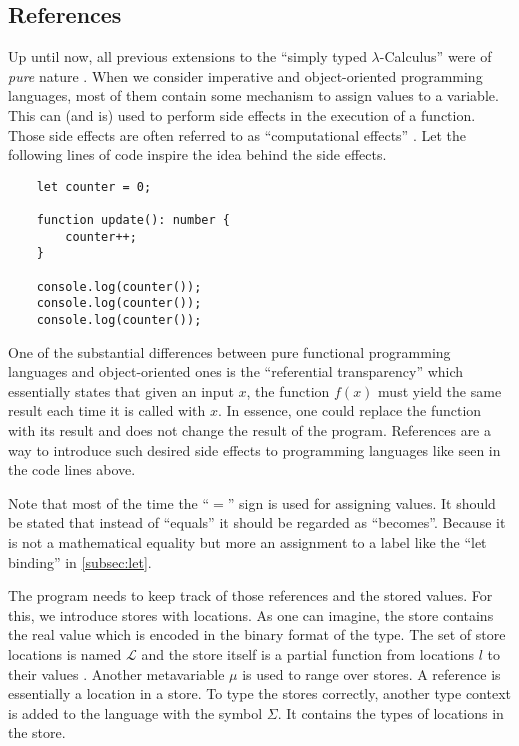 \subsection{References}

Up until now, all previous extensions to the ``simply
typed $\lambda$-Calculus'' were of \textit{pure} nature \cite{pierce2002ProgLang}.
When we consider imperative and object-oriented programming languages,
most of them contain some mechanism to assign values to a variable.
This can (and is) used to perform side effects in the execution
of a function. Those side effects are often referred to as 
``computational effects'' \cite{pierce2002ProgLang}. Let the
following lines of code inspire the idea behind the side effects.

\begin{verbatim}
    let counter = 0;

    function update(): number {
        counter++;
    }

    console.log(counter());
    console.log(counter());
    console.log(counter());
\end{verbatim}

One of the substantial differences between pure functional programming
languages and object-oriented ones is the ``referential transparency''
which essentially states that given an input $x$, the function $f(x)$
must yield the same result each time it is called with $x$. In essence,
one could replace the function with its result and does not change
the result of the program. References are a way to introduce such
desired side effects to programming languages like seen in the
code lines above.

Note that most of the time the ``$=$'' sign is used for assigning values. It should be
stated that instead of ``equals'' it should be regarded as ``becomes''.
Because it is not a mathematical equality but more an assignment
to a label like the ``let binding'' in \ref{subsec:let}.

The program needs to keep track of those references and the stored values.
For this, we introduce stores with locations.
As one can imagine, the store contains the real value which is encoded
in the binary format of the type. The set of store locations is named $\mathcal{L}$
and the store itself is a partial function from locations $l$ to their values
\cite{pierce2002ProgLang}. Another metavariable $\mu$ is used to range
over stores. A reference is essentially a location in a store.
To type the stores correctly, another type context is added to the language
with the symbol $\Sigma$. It contains the types of locations in the store.

